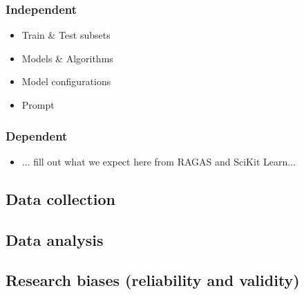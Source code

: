 \subsubsection{Independent}

\begin{itemize}
    \item Train \& Test subsets
    \item Models \& Algorithms
    \item Model configurations
    \item Prompt
\end{itemize}

\subsubsection{Dependent}

\begin{itemize}
    \item ... fill out what we expect here from RAGAS and SciKit Learn...
\end{itemize}

\subsection{Data collection}
%

\subsection{Data analysis}
%

\subsection{Research biases (reliability and validity)}
%
